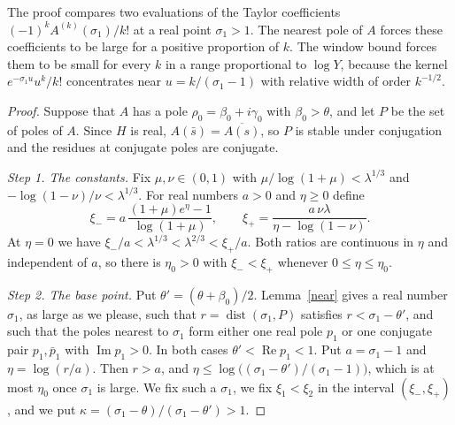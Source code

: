 The proof compares two evaluations of the Taylor coefficients $(-1)^kA^{(k)}(\sigma_1)/k!$ at a real point $\sigma_1>1$. The nearest pole of $A$ forces these coefficients to be large for a positive proportion of $k$. The window bound forces them to be small for every $k$ in a range proportional to $\log Y$, because the kernel $e^{-\sigma_1u}u^k/k!$ concentrates near $u=k/(\sigma_1-1)$ with relative width of order $k^{-1/2}$.

\begin{proof}
Suppose that $A$ has a pole $\rho_0=\beta_0+i\gamma_0$ with $\beta_0>\theta$, and let $P$ be the set of poles of $A$. Since $H$ is real, $A(\bar s)=\overline{A(s)}$, so $P$ is stable under conjugation and the residues at conjugate poles are conjugate.

\emph{Step 1. The constants.} Fix $\mu,\nu\in(0,1)$ with $\mu/\log(1+\mu)<\lambda^{1/3}$ and $-\log(1-\nu)/\nu<\lambda^{1/3}$. For real numbers $a>0$ and $\eta\ge0$ define
\[
\xi_-=a\,\frac{(1+\mu)e^{\eta}-1}{\log(1+\mu)},\qquad \xi_+=\frac{a\,\nu\lambda}{\eta-\log(1-\nu)} .
\]
At $\eta=0$ we have $\xi_-/a<\lambda^{1/3}<\lambda^{2/3}<\xi_+/a$. Both ratios are continuous in $\eta$ and independent of $a$, so there is $\eta_0>0$ with $\xi_-<\xi_+$ whenever $0\le\eta\le\eta_0$.

\emph{Step 2. The base point.} Put $\theta'=(\theta+\beta_0)/2$. Lemma~\ref{near} gives a real number $\sigma_1$, as large as we please, such that $r=\operatorname{dist}(\sigma_1,P)$ satisfies $r<\sigma_1-\theta'$, and such that the poles nearest to $\sigma_1$ form either one real pole $p_1$ or one conjugate pair $p_1,\bar p_1$ with $\operatorname{Im}p_1>0$. In both cases $\theta'<\operatorname{Re}p_1<1$. Put $a=\sigma_1-1$ and $\eta=\log(r/a)$. Then $r>a$, and $\eta\le\log\big((\sigma_1-\theta')/(\sigma_1-1)\big)$, which is at most $\eta_0$ once $\sigma_1$ is large. We fix such a $\sigma_1$, we fix $\xi_1<\xi_2$ in the interval $(\xi_-,\xi_+)$, and we put $\kappa=(\sigma_1-\theta)/(\sigma_1-\theta')>1$.


\end{proof}
